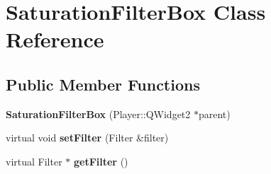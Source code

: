 \hypertarget{classSaturationFilterBox}{}\section{Saturation\+Filter\+Box Class Reference}
\label{classSaturationFilterBox}
\subsection*{Public Member Functions}
\begin{DoxyCompactItemize}
\item 
\hypertarget{classSaturationFilterBox_af6b5df75c0a534032469812103be519f}{}{\bfseries Saturation\+Filter\+Box} (Player\+::\+Q\+Widget2 $\ast$parent)\label{classSaturationFilterBox_af6b5df75c0a534032469812103be519f}

\item 
\hypertarget{classSaturationFilterBox_a09e99b0db09b8468ce7d7e0f98293ac5}{}virtual void {\bfseries set\+Filter} (Filter \&filter)\label{classSaturationFilterBox_a09e99b0db09b8468ce7d7e0f98293ac5}

\item 
\hypertarget{classSaturationFilterBox_ad7b14770615490d1445c958c79fd3adb}{}virtual Filter $\ast$ {\bfseries get\+Filter} ()\label{classSaturationFilterBox_ad7b14770615490d1445c958c79fd3adb}

\end{DoxyCompactItemize}
